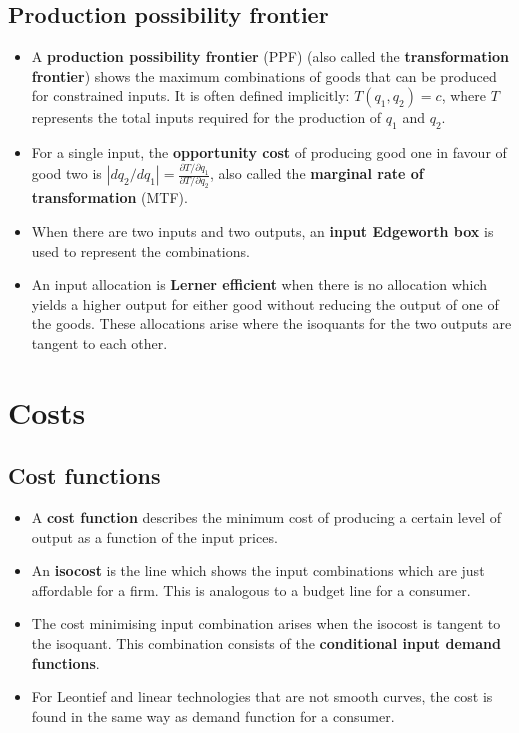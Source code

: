 \documentclass[a4paper]{article}
\begin{document}
\subsection{Production possibility frontier}
\begin{itemize}
    \item A \textbf{production possibility frontier} (PPF) (also called the \textbf{transformation frontier}) shows the maximum combinations of goods that can be produced for constrained inputs. It is often defined implicitly: $T(q_1, q_2) = c$, where $T$ represents the total inputs required for the production of $q_1$ and $q_2$. 
    \item For a single input, the \textbf{opportunity cost} of producing good one in favour of good two is $| dq_2/dq_1 | = \frac{\partial T / \partial q_1}{\partial T / \partial q_2}$, also called the \textbf{marginal rate of transformation} (MTF).
    \item When there are two inputs and two outputs, an \textbf{input Edgeworth box} is used to represent the combinations. 
    \item An input allocation is \textbf{Lerner efficient} when there is no allocation which yields a higher output for either good without reducing the output of one of the goods. These allocations arise where the isoquants for the two outputs are tangent to each other.
\end{itemize}

\section{Costs}
\subsection{Cost functions}
\begin{itemize}
    \item A \textbf{cost function} describes the minimum cost of producing a certain level of output as a function of the input prices. 
    \item An \textbf{isocost} is the line which shows the input combinations which are just affordable for a firm. This is analogous to a budget line for a consumer.
    \item The cost minimising input combination arises when the isocost is tangent to the isoquant. This combination consists of the \textbf{conditional input demand functions}.
    \item For Leontief and linear technologies that are not smooth curves, the cost is found in the same way as demand function for a consumer.
\end{itemize}
\end{document}
